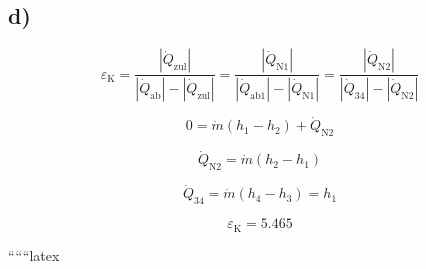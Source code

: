 

\subsection*{d)}

\[
\varepsilon_{\text{K}} = \frac{\left| \dot{Q}_{\text{zul}} \right|}{\left| \dot{Q}_{\text{ab}} \right| - \left| \dot{Q}_{\text{zul}} \right|} = \frac{\left| \dot{Q}_{\text{N1}} \right|}{\left| \dot{Q}_{\text{ab1}} \right| - \left| \dot{Q}_{\text{N1}} \right|} = \frac{\left| \dot{Q}_{\text{N2}} \right|}{\left| \dot{Q}_{\text{34}} \right| - \left| \dot{Q}_{\text{N2}} \right|}
\]


\[
0 = \dot{m} \left( h_1 - h_2 \right) + \dot{Q}_{\text{N2}}
\]

\[
\dot{Q}_{\text{N2}} = \dot{m} \left( h_2 - h_1 \right)
\]

\[
\dot{Q}_{34} = \dot{m} \left( h_4 - h_3 \right) = h_1
\]

\[
\varepsilon_{\text{K}} = 5.465
\]

``````latex